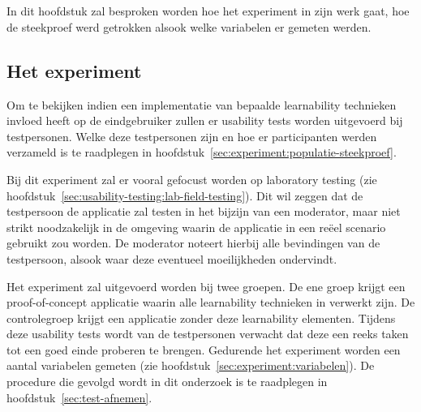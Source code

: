\chapter{}
\label{ch:methodologie}



In dit hoofdstuk zal besproken worden hoe het experiment in zijn werk gaat, hoe de steekproef werd getrokken alsook welke variabelen er gemeten werden.

\section{Het experiment}
\label{sec:experiment}

Om te bekijken indien een implementatie van bepaalde learnability technieken invloed heeft op de eindgebruiker zullen er usability tests worden uitgevoerd bij testpersonen. Welke deze testpersonen zijn en hoe er participanten werden verzameld is te raadplegen in hoofdstuk~\ref{sec:experiment:populatie-steekproef}.

Bij dit experiment zal er vooral gefocust worden op laboratory testing (zie hoofdstuk~\ref{sec:usability-testing:lab-field-testing}). Dit wil zeggen dat de testpersoon de applicatie zal testen in het bijzijn van een moderator, maar niet strikt noodzakelijk in de omgeving waarin de applicatie in een reëel scenario gebruikt zou worden. De moderator noteert hierbij alle bevindingen van de testpersoon, alsook waar deze eventueel moeilijkheden ondervindt.

Het experiment zal uitgevoerd worden bij twee groepen. De ene groep krijgt een proof-of-concept applicatie waarin alle learnability technieken in verwerkt zijn. De controlegroep krijgt een applicatie zonder deze learnability elementen. Tijdens deze usability tests wordt van de testpersonen verwacht dat deze een reeks taken tot een goed einde proberen te brengen. Gedurende het experiment worden een aantal variabelen gemeten (zie hoofdstuk~\ref{sec:experiment:variabelen}). De procedure die gevolgd wordt in dit onderzoek is te raadplegen in hoofdstuk~\ref{sec:test-afnemen}.

